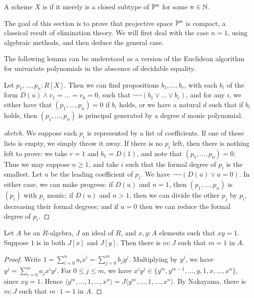 \begin{definition}
  A scheme $X$ is  if it merely is a closed subtype of $\mathbb{P}^n$ for some $n\in\mathbb{N}$.
\end{definition}

The goal of this section is to prove that projective space $\mathbb{P}^n$ is compact,
a classical result of elimination theory.
We will first deal with the case $n = 1$, using algebraic methods, and
then deduce the general case.

The following lemma can be understood as a version of the Euclidean algorithm
for univariate polynomials in the abscence of decidable equality.
\begin{proposition}\label{euclid}
  Let $p_1, \ldots, p_n : R[X]$. Then we can find propositions
  $b_1,\ldots,b_r$, with each $b_i$ of the form $D(u) \wedge v_1 = \ldots = v_k = 0$,
  such that $\neg \neg (b_1 \vee \ldots \vee b_r)$,
  and for any $i$, we either have that $(p_1,\ldots,p_n) = 0$ if $b_i$ holds,
  or we have a natural $d$ such that if $b_i$ holds,
  then $(p_1,\ldots,p_n)$ is principal generated by a degree $d$ monic polynomial.
\end{proposition}
\begin{proof}[sketch]
  We suppose each $p_i$ is represented by a list of coefficients.
  If one of these lists is empty, we simply throw it away.
  If there is no $p_i$ left,
  then there is nothing left to prove: we take $r = 1$ and $b_1 = D(1)$,
  and note that $(p_1,\ldots,p_n) = 0$.
  Thus we may suppose $n \ge 1$, and take $i$ such that the formal degree
  of $p_i$ is the smallest. Let $u$ be the leading coefficient of $p_i$.
  We have $\neg \neg (D(u) \vee u = 0)$. 
  In either case, we can make progress: if $D(u)$ and $n = 1$,
  then $(p_1,\ldots,p_n)$ is $(p_i)$ with $p_i$ monic;
  if $D(u)$ and $n > 1$, then we can divide the other $p_j$ by $p_i$,
  decreasing their formal degrees;
  and if $u = 0$ then we can reduce the formal degree of $p_i$.
\end{proof}

\begin{lemma}\label{lorenzen}
  Let $A$ be an $R$-algebra, $J$ an ideal of $R$, and $x, y : A$ elements
  such that $xy = 1$. Suppose $1$ is in both $J[x]$ and $J[y]$.
  Then there is $m : J$  such that $m = 1$ in $A$.
\end{lemma}
\begin{proof}
  Write $1 = \sum_{i=0}^n a_ix^i = \sum_{j=0}^m b_j y^j$.
  Multiplying by $y^j$, we have
  $y^j = \sum_{i=0}^n a_j x^i y^j$.
  For $0 \le j \le m$, we have
  $x^i y^j \in \{y^m,y^{m-1},\ldots,y,1,x,\ldots,x^n\}$, since $xy = 1$.
  Hence $\langle y^m,\ldots,1,\ldots,x^n \rangle = J\langle y^m,\ldots,1,\ldots,x^n\rangle$.
  By Nakayama, there is $m : J$ such that $m \cdot 1 = 1$ in $A$.
\end{proof}

